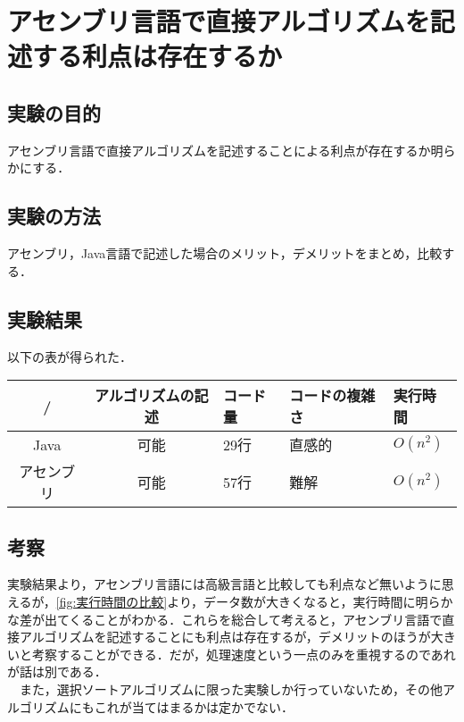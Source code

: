 \chapter{アセンブリ言語で直接アルゴリズムを記述する利点は存在するか}
\section{実験の目的}
アセンブリ言語で直接アルゴリズムを記述することによる利点が存在するか明らかにする．

\section{実験の方法}
アセンブリ，Java言語で記述した場合のメリット，デメリットをまとめ，比較する．

\section{実験結果}
以下の表が得られた．
\begin{table}[h]
  \begin{tabular}{c|clll}
   / &  アルゴリズムの記述 & コード量 & コードの複雑さ & 実行時間\\ \hline
   Java & 可能 & 29行 & 直感的 & $O(n^2)$\\
   アセンブリ & 可能 & 57行 & 難解 & $O(n^2)$\\
  \end{tabular}
\end{table}

\section{考察}
実験結果より，アセンブリ言語には高級言語と比較しても利点など無いように思えるが，\ref{fig:実行時間の比較}より，データ数が大きくなると，実行時間に明らかな差が出てくることがわかる．これらを総合して考えると，アセンブリ言語で直接アルゴリズムを記述することにも利点は存在するが，デメリットのほうが大きいと考察することができる．だが，処理速度という一点のみを重視するのであれが話は別である．\\
 \ \ また，選択ソートアルゴリズムに限った実験しか行っていないため，その他アルゴリズムにもこれが当てはまるかは定かでない．
